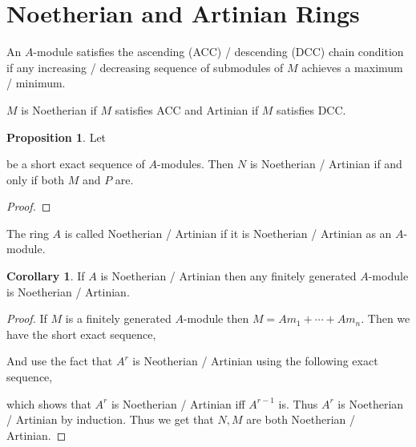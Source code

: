 \documentclass[12pt]{article}
\theoremstyle{remark}
\theoremstyle{definition}
\newtheorem{proposition}[theorem]{Proposition}
\newtheorem{corollary}[theorem]{Corollary}
\newenvironment{definition}[1][Definition:]{\begin{trivlist}
\item[\hskip \labelsep {\bfseries #1}]}{\end{trivlist}}
\begin{document}
\section{Noetherian and Artinian Rings}

\begin{definition}
An $A$-module satisfies the ascending (ACC) / descending (DCC) chain condition if any increasing / decreasing sequence of submodules of $M$ achieves a maximum / minimum.
\end{definition}

\begin{definition}
$M$ is Noetherian if $M$ satisfies ACC and Artinian if $M$ satisfies DCC. 
\end{definition}

\begin{proposition}
Let 
\begin{center}
\end{center} 
be a short exact sequence of $A$-modules. Then $N$ is Noetherian / Artinian if and only if both $M$ and $P$ are. 
\end{proposition}

\begin{proof}

\end{proof}

\begin{definition}
The ring $A$ is called Noetherian / Artinian if it is Noetherian / Artinian as an $A$-module. 
\end{definition}

\begin{corollary}
If $A$ is Noetherian / Artinian then any finitely generated $A$-module is Noetherian / Artinian.
\end{corollary}

\begin{proof}
If $M$ is a finitely generated $A$-module then $M = A m_1 + \cdots + A m_n$. Then we have the short exact sequence,
\begin{center}
\end{center} 
And use the fact that $A^r$ is Neotherian / Artinian using the following exact sequence,
\begin{center}
\end{center}  
which shows that $A^r$ is Noetherian / Artinian iff $A^{r-1}$ is. Thus $A^{r}$ is Noetherian / Artinian by induction. 
Thus we get that $N, M$ are both Noetherian / Artinian. 
\end{proof}
\end{document}

